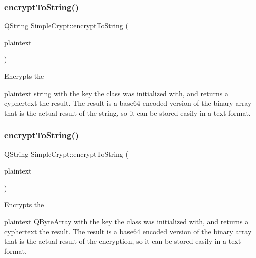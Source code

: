 \subsubsection{\texorpdfstring{encryptToString()}{encryptToString()}\hspace{0.1cm}{\footnotesize\ttfamily [1/2]}}
{\footnotesize\ttfamily Q\+String Simple\+Crypt\+::encrypt\+To\+String (\begin{DoxyParamCaption}\item[{const Q\+String \&}]{plaintext }\end{DoxyParamCaption})}

Encrypts the \begin{DoxyItemize}
\item plaintext string with the key the class was initialized with, and returns a cyphertext the result. The result is a base64 encoded version of the binary array that is the actual result of the string, so it can be stored easily in a text format. \end{DoxyItemize}
\mbox{\label{class_simple_crypt_aa72b79bf7a5bb971bf3b0a52b9247efd}} 
\subsubsection{\texorpdfstring{encryptToString()}{encryptToString()}\hspace{0.1cm}{\footnotesize\ttfamily [2/2]}}
{\footnotesize\ttfamily Q\+String Simple\+Crypt\+::encrypt\+To\+String (\begin{DoxyParamCaption}\item[{Q\+Byte\+Array}]{plaintext }\end{DoxyParamCaption})}

Encrypts the \begin{DoxyItemize}
\item plaintext Q\+Byte\+Array with the key the class was initialized with, and returns a cyphertext the result. The result is a base64 encoded version of the binary array that is the actual result of the encryption, so it can be stored easily in a text format. \end{DoxyItemize}
\mbox{\label{class_simple_crypt_ad800808bcffc9a09225c651200b3ef5c}} 
